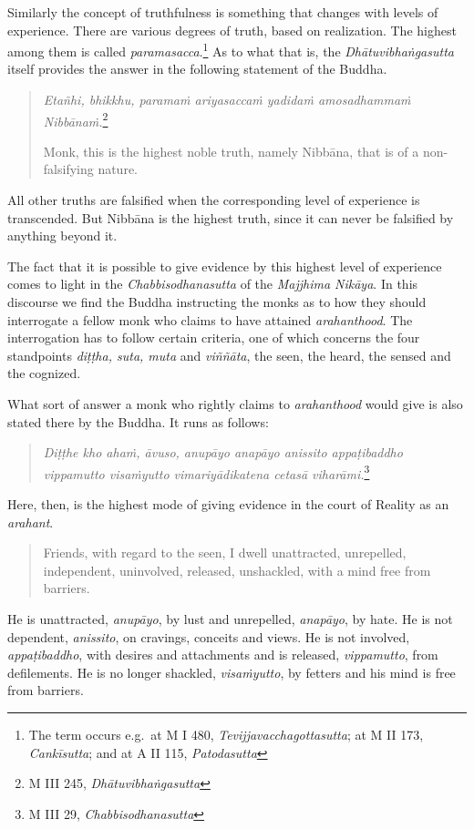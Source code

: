 Similarly the concept of truthfulness is something that changes with levels of experience. There are various degrees of truth, based on realization. The highest among them is called \emph{paramasacca}.\footnote{The term occurs e.g.~at M I 480, \emph{Tevijjavacchagottasutta}; at M II 173, \emph{Cankīsutta}; and at A II 115, \emph{Patodasutta}} As to what that is, the \emph{Dhātuvibhaṅgasutta} itself provides the answer in the following statement of the Buddha.

\begin{quote}
\emph{Etañhi, bhikkhu, paramaṁ ariyasaccaṁ yadidaṁ amosadhammaṁ Nibbānaṁ.}\footnote{M III 245, \emph{Dhātuvibhaṅgasutta}}

Monk, this is the highest noble truth, namely Nibbāna, that is of a non-falsifying nature.
\end{quote}

All other truths are falsified when the corresponding level of experience is transcended. But Nibbāna is the highest truth, since it can never be falsified by anything beyond it.

The fact that it is possible to give evidence by this highest level of experience comes to light in the \emph{Chabbisodhanasutta} of the \emph{Majjhima Nikāya}. In this discourse we find the Buddha instructing the monks as to how they should interrogate a fellow monk who claims to have attained \emph{arahanthood}. The interrogation has to follow certain criteria, one of which concerns the four standpoints \emph{diṭṭha, suta, muta} and \emph{viññāta}, the seen, the heard, the sensed and the cognized.

What sort of answer a monk who rightly claims to \emph{arahanthood} would give is also stated there by the Buddha. It runs as follows:

\begin{quote}
\emph{Diṭṭhe kho ahaṁ, āvuso, anupāyo anapāyo anissito appaṭibaddho vippamutto visaṁyutto vimariyādikatena cetasā viharāmi.}\footnote{M III 29, \emph{Chabbisodhanasutta}}
\end{quote}

Here, then, is the highest mode of giving evidence in the court of Reality as an \emph{arahant}.

\begin{quote}
Friends, with regard to the seen, I dwell unattracted, unrepelled, independent, uninvolved, released, unshackled, with a mind free from barriers.
\end{quote}

He is unattracted, \emph{anupāyo}, by lust and unrepelled, \emph{anapāyo}, by hate. He is not dependent, \emph{anissito}, on cravings, conceits and views. He is not involved, \emph{appaṭibaddho}, with desires and attachments and is released, \emph{vippamutto}, from defilements. He is no longer shackled, \emph{visaṁyutto}, by fetters and his mind is free from barriers.

